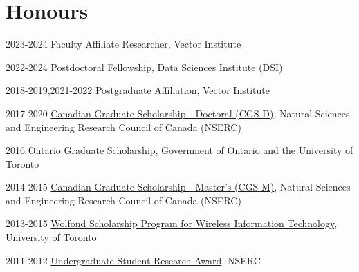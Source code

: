 \documentclass{article}
\begin{document}
\section{Honours}
\begin{CV}

  \item[2023-2024] Faculty Affiliate Researcher, Vector Institute
  
  \item[2022-2024] \href{https://datasciences.utoronto.ca/postdoctoral-fellows/}
    {Postdoctoral Fellowship}, Data Sciences Institute (DSI)

  \item[2018-2019,2021-2022] \href{https://vectorinstitute.ai/2021/03/31/vector-welcomes-new-researchers-to-postgraduate-affiliate-program/}
    {Postgraduate Affiliation}, Vector Institute

  \item[2017-2020] \href{http://www.nserc-crsng.gc.ca/Students-Etudiants/PG-CS/BellandPostgrad-BelletSuperieures_eng.asp}
    {Canadian Graduate Scholarship - Doctoral (CGS-D)}, Natural Sciences and
    Engineering Research Council of Canada (NSERC)

  \item[2016] \href{https://osap.gov.on.ca/OSAPPortal/en/A-ZListofAid/PRDR013089.html}
    {Ontario Graduate Scholarship}, Government of Ontario and the University of
    Toronto

  \item[2014-2015] \href{http://www.nserc-crsng.gc.ca/Students-Etudiants/PG-CS/CGSM-BESCM_eng.asp}
    {Canadian Graduate Scholarship - Master's (CGS-M)}, Natural Sciences and
    Engineering Research Council of Canada (NSERC)

  \item[2013-2015] \href{http://www.artsci.utoronto.ca/graduate/scholarships-awards/scholarships-by-department/computer-science}
    {Wolfond Scholarship Program for Wireless Information Technology},
    University of Toronto

  \item[2011-2012] \href{http://www.nserc-crsng.gc.ca/Students-Etudiants/UG-PC/USRA-BRPC_eng.asp}
    {Undergraduate Student Research Award}, NSERC

\end{CV}
\end{document}

